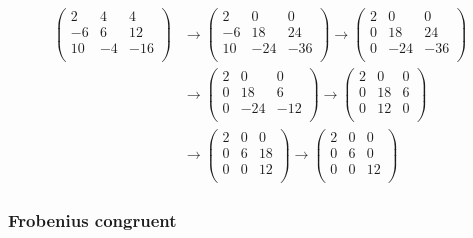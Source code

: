 \begin{align*}
  \begin{pmatrix}        2 & 4 & 4 \\        -6 & 6 & 12 \\        10 & -4 & -16 \\    \end{pmatrix}
  &\to    \begin{pmatrix}        2 & 0 & 0 \\        -6 & 18 & 24 \\        10 & -24 & -36 \\    \end{pmatrix}
  \to    \begin{pmatrix}        2 & 0 & 0 \\        0 & 18 & 24 \\        0 & -24 & -36 \\    \end{pmatrix}    \\
  &\to    \begin{pmatrix}        2 & 0 & 0 \\        0 & 18 & 6 \\        0 & -24 & -12 \\     \end{pmatrix}
  \to    \begin{pmatrix}        2 & 0 & 0 \\        0 & 18 & 6 \\        0 & 12 & 0 \\    \end{pmatrix}    \\
  &\to    \begin{pmatrix}        2 & 0 & 0 \\        0 & 6 & 18 \\        0 & 0 & 12 \\    \end{pmatrix}
  \to    \begin{pmatrix}        2 & 0 & 0 \\        0 & 6 & 0 \\        0 & 0 & 12 \\    \end{pmatrix}
\end{align*}

\subsubsection{Frobenius congruent}

